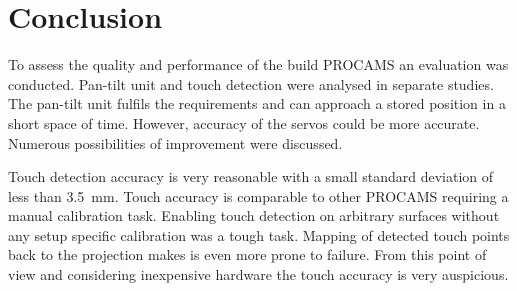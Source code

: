 \section{Conclusion}
To assess the quality and performance of the build PROCAMS an evaluation was conducted. Pan-tilt unit and touch detection were analysed in separate studies. The pan-tilt unit fulfils the requirements and can approach a stored position in a short space of time. However, accuracy of the servos could be more accurate. Numerous possibilities of improvement were discussed.

Touch detection accuracy is very reasonable with a small standard deviation of less than \SI{3.5}{\mm}. Touch accuracy is comparable to other PROCAMS requiring a manual calibration task. Enabling touch detection on arbitrary surfaces without any setup specific calibration was a tough task. Mapping of detected touch points back to the projection makes is even more prone to failure. From this point of view and considering inexpensive hardware the touch accuracy is very auspicious.